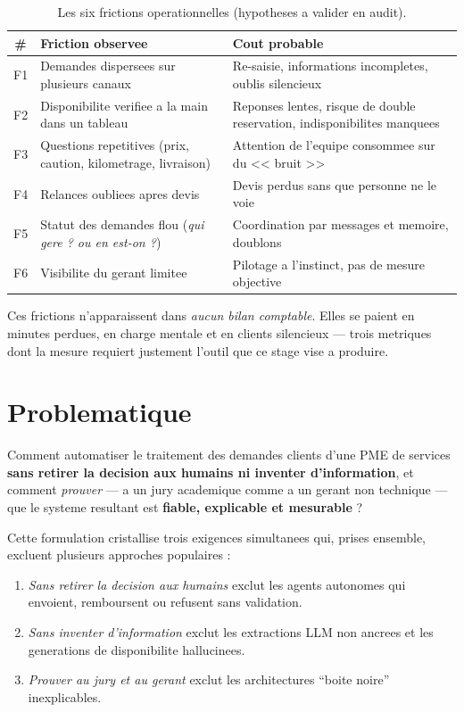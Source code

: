 \documentclass[12pt,a4paper,openany]{report}
\begin{document}
\begin{table}[H]\centering\small
\caption{Les six frictions operationnelles (hypotheses a valider en audit).}
\label{tab:frictions}
\begin{tabularx}{\textwidth}{c l X}\toprule
\rowcolor{boxBlue!30}\textbf{\#} & \textbf{Friction observee} & \textbf{Cout probable}\\\midrule
F1 & Demandes dispersees sur plusieurs canaux            & Re-saisie, informations incompletes, oublis silencieux\\
F2 & Disponibilite verifiee a la main dans un tableau    & Reponses lentes, risque de double reservation, indisponibilites manquees\\
F3 & Questions repetitives (prix, caution, kilometrage, livraison) & Attention de l'equipe consommee sur du << bruit >>\\
F4 & Relances oubliees apres devis                        & Devis perdus sans que personne ne le voie\\
F5 & Statut des demandes flou (\emph{qui gere ? ou en est-on ?}) & Coordination par messages et memoire, doublons\\
F6 & Visibilite du gerant limitee                         & Pilotage a l'instinct, pas de mesure objective\\
\bottomrule
\end{tabularx}
\end{table}

Ces frictions n'apparaissent dans \emph{aucun bilan comptable}. Elles se paient en minutes perdues, en charge mentale et en clients silencieux --- trois metriques dont la mesure requiert justement l'outil que ce stage vise a produire.

\section{Problematique}

\begin{problembox}
Comment automatiser le traitement des demandes clients d'une PME de services \textbf{sans retirer la decision aux humains ni inventer d'information}, et comment \emph{prouver} --- a un jury academique comme a un gerant non technique --- que le systeme resultant est \textbf{fiable, explicable et mesurable} ?
\end{problembox}

Cette formulation cristallise trois exigences simultanees qui, prises ensemble, excluent plusieurs approches populaires :
\begin{enumerate}[leftmargin=1.5cm]
    \item \emph{Sans retirer la decision aux humains} exclut les agents autonomes qui envoient, remboursent ou refusent sans validation.
    \item \emph{Sans inventer d'information} exclut les extractions LLM non ancrees et les generations de disponibilite hallucinees.
    \item \emph{Prouver au jury et au gerant} exclut les architectures ``boite noire'' inexplicables.
\end{enumerate}
\end{document}
